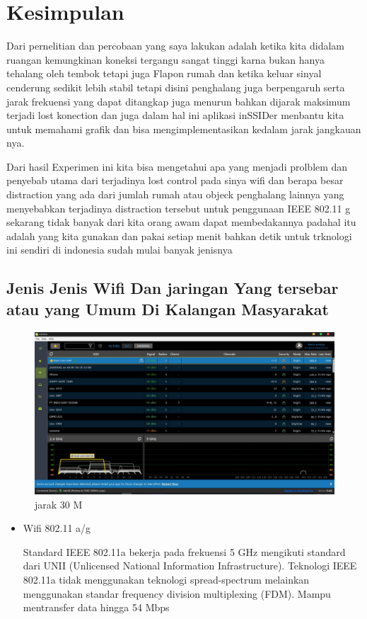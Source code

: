 \documentclass[conference]{IEEEtran}
\begin{document}
\section{Kesimpulan}
Dari pernelitian dan percobaan yang saya lakukan adalah ketika kita didalam ruangan kemungkinan koneksi tergangu sangat tinggi karna bukan hanya tehalang oleh tembok tetapi juga Flapon rumah dan ketika keluar sinyal cenderung sedikit lebih stabil tetapi disini penghalang juga berpengaruh serta jarak frekuensi yang dapat ditangkap juga menurun bahkan dijarak maksimum terjadi lost konection dan juga dalam hal ini aplikasi inSSIDer menbantu kita untuk memahami grafik dan bisa mengimplementasikan kedalam jarak jangkauan nya.
\vspace{1pt}

Dari hasil Experimen ini kita bisa mengetahui apa yang menjadi prolblem dan penyebab utama dari terjadinya lost control pada sinya wifi dan berapa besar distraction yang ada dari jumlah rumah atau objeck penghalang lainnya yang menyebabkan terjadinya distraction tersebut untuk penggunaan IEEE 802.11 g sekarang tidak banyak dari kita orang awam dapat membedakannya padahal itu adalah yang kita gunakan dan pakai setiap menit bahkan detik untuk trknologi ini sendiri di indonesia sudah mulai banyak jenisnya 
\vspace{1pt}

\subsection{Jenis Jenis Wifi Dan jaringan Yang tersebar atau yang Umum Di Kalangan Masyarakat}
\begin{figure}[h]
\centering
    \includegraphics[width=.3\textwidth]{image/012.jpg}
     \caption{jarak 30 M}
     \end{figure}
     \vspace{4 cm}
     
\begin{itemize}
    \item Wifi 802.11 a/g
    \vspace{1pt}
    
    Standard IEEE 802.11a bekerja pada frekuensi 5 GHz mengikuti standard dari UNII (Unlicensed National Information Infrastructure). Teknologi IEEE 802.11a tidak menggunakan teknologi spread-spectrum melainkan menggunakan standar frequency division multiplexing (FDM). Mampu mentransfer data hingga 54 Mbps
    
\end{itemize}


\cite{DhaniPro2021}
\cite{IlmuKomputer.com2021}
\cite{Khayat2012}
\cite{Kreasi2021}
\cite{Metageek2021}

\end{document}
